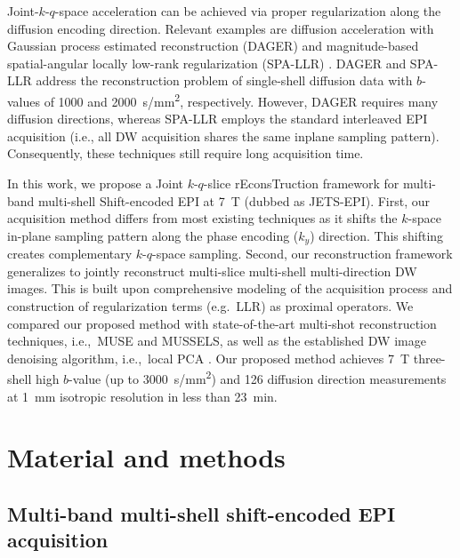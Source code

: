 \documentclass[preprint,12pt,authoryear,review]{elsarticle}
\begin{document}
	Joint-$k$-$q$-space acceleration can be achieved via proper regularization
	along the diffusion encoding direction.
	Relevant examples are
	diffusion acceleration with Gaussian process estimated reconstruction (DAGER)
        \citep{wu_2019_dager} and magnitude-based spatial-angular locally low-rank regularization
	(SPA-LLR) \citep{hu_2020_spa_llr}.
	DAGER and SPA-LLR address the reconstruction problem of single-shell diffusion data
	with $b$-values of \num{1000} and \SI{2000}{s/mm^2}, respectively.
	However, DAGER requires many diffusion directions,
	whereas SPA-LLR employs the standard interleaved EPI acquisition
	(i.e., all DW acquisition shares the same inplane sampling pattern).
        Consequently, these techniques still require long acquisition time.

	In this work, we propose a Joint $k$-$q$-slice rEconsTruction framework
	for multi-band multi-shell Shift-encoded EPI at \SI{7}{\tesla}
	(dubbed as JETS-EPI).
	First, our acquisition method differs from most existing techniques
	as it shifts the $k$-space in-plane sampling pattern
	along the phase encoding ($k_y$) direction.
	This shifting creates complementary $k$-$q$-space sampling.
	Second, our reconstruction framework generalizes to
	jointly reconstruct multi-slice multi-shell multi-direction DW images.
	This is built upon comprehensive modeling of the acquisition process
	and construction of regularization terms (e.g.~LLR) as proximal operators.
	We compared our proposed method with
	state-of-the-art multi-shot reconstruction techniques,
	i.e.,~MUSE and MUSSELS,
	as well as the established DW image denoising algorithm,
	i.e.,~local PCA \citep{manjon_2013_localpca,veraart_2016_denoise}.
	Our proposed method achieves \SI{7}{\tesla}
	three-shell high $b$-value (up to \SI{3000}{s/mm^2})
        and 126 diffusion direction measurements
	at \SI{1}{mm} isotropic resolution in less than \SI{23}{min}.

	\clearpage

	\section{Material and methods}
	\label{SEC:Meth}

	\subsection{Multi-band multi-shell shift-encoded EPI acquisition}
\end{document}
